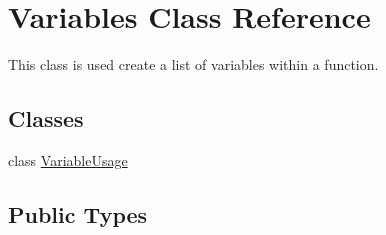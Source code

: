 \hypertarget{class_variables}{\section{Variables Class Reference}
\label{class_variables}
}


This class is used create a list of variables within a function.  


\subsection*{Classes}
\begin{DoxyCompactItemize}
\item 
class \hyperlink{class_variables_1_1_variable_usage}{Variable\-Usage}
\end{DoxyCompactItemize}
\subsection*{Public Types}
